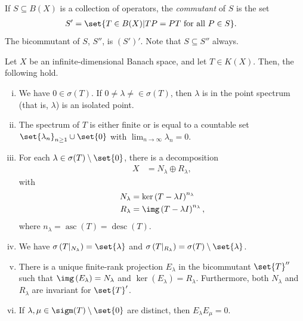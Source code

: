 \documentclass[10pt]{mypackage}
\begin{document}
\begin{definition}
  If $S\subseteq B(X)$ is a collection of operators, the \textit{commutant} of $S$ is the set
  \begin{align*}
    S' &= \set{T\in B(X) | TP = PT\text{ for all }P\in S}.
  \end{align*}
  The bicommutant of $S$, $S''$, is $(S')'$. Note that $S\subseteq S''$ always.
\end{definition}
\begin{theorem}
  Let $X$ be an infinite-dimensional Banach space, and let $T\in K(X)$. Then, the following hold.
  \begin{enumerate}[(i)]
    \item We have $0\in \sigma(T)$. If $0\neq \lambda\neq\in \sigma(T) $, then $\lambda$ is in the point spectrum (that is, $\lambda$) is an isolated point.
    \item The spectrum of $T$ is either finite or is equal to a countable set $\set{\lambda_n}_{n\geq 1}\cup \set{0}$ with $\lim_{n\rightarrow\infty}\lambda_n = 0$.
    \item For each $\lambda\in \sigma(T)\setminus \set{0}$, there is a decomposition
      \begin{align*}
        X &= N_{\lambda} \oplus R_{\lambda},
      \end{align*}
      with
      \begin{align*}
        N_{\lambda} &= \ker\left( T-\lambda I \right)^{n_{\lambda}}\\
        R_{\lambda} &= \img\left( T-\lambda I \right)^{n_{\lambda}},
      \end{align*}
      where $n_{\lambda} = \operatorname{asc}(T) = \operatorname{desc}(T)$.
    \item We have $\sigma\left( T|_{N_{\lambda}} \right) = \set{\lambda}$ and $\sigma\left( T|_{R_{\lambda}} \right) = \sigma(T)\setminus \set{\lambda}$.
    \item There is a unique finite-rank projection $E_{\lambda}$ in the bicommutant $\set{T}''$ such that $\img\left( E_{\lambda} \right) = N_{\lambda}$ and $\ker\left( E_{\lambda} \right) = R_{\lambda}$. Furthermore, both $N_{\lambda}$ and $R_{\lambda}$ are invariant for $\set{T}'$.
    \item If $\lambda,\mu\in \sigm(T)\setminus \set{0}$ are distinct, then $E_{\lambda}E_{\mu} = 0$.
  \end{enumerate}
\end{theorem}
\end{document}
